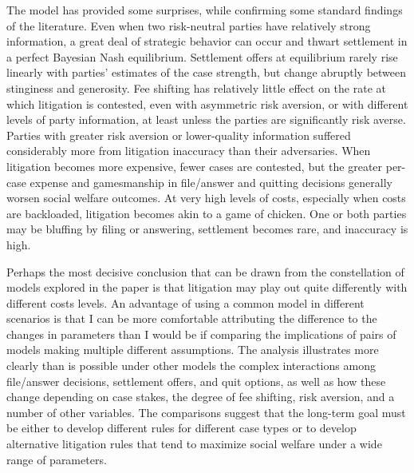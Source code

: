 \documentclass{article}
\begin{document}
The model has provided some surprises, while confirming some standard findings of the literature. Even when two risk-neutral parties have relatively strong information, a great deal of strategic behavior can occur and thwart settlement in a perfect Bayesian Nash equilibrium. Settlement offers at equilibrium rarely rise linearly with parties' estimates of the case strength, but change abruptly between stinginess and generosity. Fee shifting has relatively little effect on the rate at which litigation is contested, even with asymmetric risk aversion, or with different levels of party information, at least unless the parties are significantly risk averse. Parties with greater risk aversion or lower-quality information suffered considerably more from litigation inaccuracy than their adversaries.  When litigation becomes more expensive, fewer cases are contested, but the greater per-case expense and gamesmanship in file/answer and quitting decisions generally worsen social welfare outcomes. At very high levels of costs, especially when costs are backloaded, litigation becomes akin to a game of chicken. One or both parties may be bluffing by filing or answering, settlement becomes rare, and inaccuracy is high. 

Perhaps the most decisive conclusion that can be drawn from the constellation of models explored in the paper is that litigation may play out quite differently with different costs levels. An advantage of using a common model in different scenarios is that I can be more comfortable attributing the difference to the changes in parameters than I would be if comparing the implications of pairs of models making multiple different assumptions. The analysis illustrates more clearly than is possible under other models the complex interactions among file/answer decisions, settlement offers, and quit options, as well as how these change depending on case stakes, the degree of fee shifting, risk aversion, and a number of other variables. The comparisons suggest that the long-term goal must be either to develop different rules for different case types or to develop alternative litigation rules that tend to maximize social welfare under a wide range of parameters. 
\end{document}
